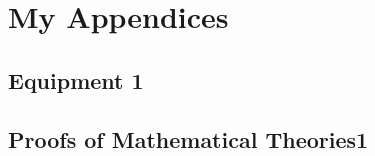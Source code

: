 \appendix
\chapter*{My Appendices}
\renewcommand{\thesection}{\Alph{section}} %
 
\thispagestyle{empty}

\section{Equipment 1}
\label{appendix:equipment}

\section{Proofs of Mathematical Theories1}
\label{appendix:math}